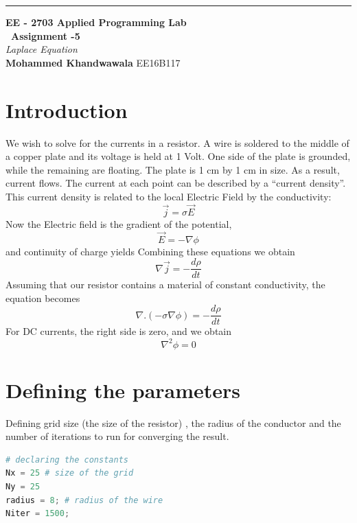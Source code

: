 \documentclass[a4paper]{article}
\begin{document}
\begin{titlepage}
	\raggedleft
	\rule{1pt}{\textheight} 
	\hspace{0.05\textwidth} 
	\parbox[b]{0.75\textwidth}{		
		{\LARGE\bfseries EE - 2703 Applied Programming Lab \\[0.5\baselineskip]  ~\huge Assignment -5}\\[2\baselineskip] 
		{\large\textit{Laplace Equation}}\\[4\baselineskip] 
		{\Large\textbf{Mohammed Khandwawala}}
        \large EE16B117
		\vspace{0.5\textheight}  
	}

\end{titlepage}


\tableofcontents


\section{Introduction}



We wish to solve for the currents in a resistor.
A wire is soldered to the middle of a copper plate and its voltage is held at 1 Volt.  One side of the plate is
grounded, while the remaining are floating. The plate is 1 cm by 1 cm in size.
As a result,  current flows.   The current at each
point can be described by a “current density”. This
current density is related to the local Electric Field by the conductivity:
$$ \vec{j} = \sigma \vec{E} $$
Now the Electric field is the gradient of the potential,
$$ \vec{E} = -\nabla \phi $$
and continuity of charge yields
Combining these equations we obtain
$$ \nabla \vec{j} = -\frac{d\rho}{dt}$$
Assuming that our resistor contains a material of constant conductivity, the equation becomes
$$ \nabla . (-\sigma \nabla \phi) = -\frac{d\rho}{dt} $$
For DC currents, the right side is zero, and we obtain
$$  \nabla^{2} \phi = 0 $$

\section{Defining the parameters}

Defining grid size (the size of the resistor) , the radius of the conductor and the number of iterations to run for converging the result.
\begin{lstlisting}[language=Python]
# declaring the constants 
Nx = 25	# size of the grid
Ny = 25
radius = 8; # radius of the wire
Niter = 1500;

\end{lstlisting}
\end{document}
